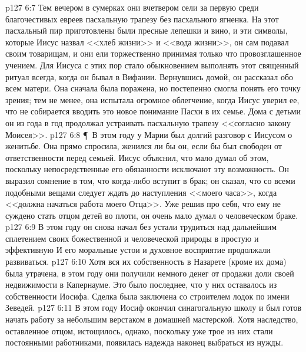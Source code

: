 \vs p127 6:7 Тем вечером в сумерках они вчетвером сели за первую среди благочестивых евреев пасхальную трапезу без пасхального ягненка. На этот пасхальный пир приготовлены были пресные лепешки и вино, и эти символы, которые Иисус назвал <<хлеб жизни>> и <<вода жизни>>, он сам подавал своим товарищам, и они ели торжественно принимая только что провозглашенное учением. Для Иисуса с этих пор стало обыкновением выполнять этот священный ритуал всегда, когда он бывал в Вифании. Вернувшись домой, он рассказал обо всем матери. Она сначала была поражена, но постепенно смогла понять его точку зрения; тем не менее, она испытала огромное облегчение, когда Иисус уверил ее, что не собирается вводить это новое понимание Пасхи в их семье. Дома с детьми он из года в год продолжал устраивать пасхальную трапезу <<согласно закону Моисея>>.
\vs p127 6:8 \P\ В этом году у Марии был долгий разговор с Иисусом о женитьбе. Она прямо спросила, женился ли бы он, если бы был свободен от ответственности перед семьей. Иисус объяснил, что мало думал об этом, поскольку непосредственные его обязанности исключают эту возможность. Он выразил сомнение в том, что когда\hyp{}либо вступит в брак; он сказал, что со всеми подобными вещами следует ждать до наступления <<моего часа>>, когда <<должна начаться работа моего Отца>>. Уже решив про себя, что ему не суждено стать отцом детей во плоти, он очень мало думал о человеческом браке.
\vs p127 6:9 В этом году он снова начал без устали трудиться над дальнейшим сплетением своих божественной и человеческой природы в простую и эффективную  И его моральные устои и духовное восприятие продолжали развиваться.
\vs p127 6:10 Хотя вся их собственность в Назарете (кроме их дома) была утрачена, в этом году они получили немного денег от продажи доли своей недвижимости в Капернауме. Это было последнее, что у них оставалось из собственности Иосифа. Сделка была заключена со строителем лодок по имени Зеведей.
\vs p127 6:11 В этом году Иосиф окончил синагогальную школу и был готов начать работу за небольшим верстаком в домашней мастерской. Хотя наследство, оставленное отцом, истощилось, однако, поскольку уже трое из них стали постоянными работниками, появилась надежда наконец выбраться из нужды.
